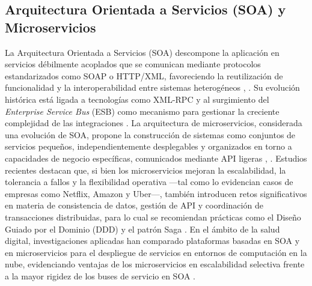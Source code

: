 \subsection{Arquitectura Orientada a Servicios (SOA) y Microservicios}

La Arquitectura Orientada a Servicios (SOA) descompone la aplicación en servicios débilmente acoplados que se comunican mediante protocolos estandarizados como SOAP o HTTP/XML, favoreciendo la reutilización de funcionalidad y la interoperabilidad entre sistemas heterogéneos \cite{lazarenko_arch}, \cite{opengroup_soa}. Su evolución histórica está ligada a tecnologías como XML-RPC y al surgimiento del \textit{Enterprise Service Bus} (ESB) como mecanismo para gestionar la creciente complejidad de las integraciones \cite{opengroup_soa}. La arquitectura de microservicios, considerada una evolución de SOA, propone la construcción de sistemas como conjuntos de servicios pequeños, independientemente desplegables y organizados en torno a capacidades de negocio específicas, comunicados mediante API ligeras \cite{gfg_patterns}, \cite{ijacsa_microservices}. Estudios recientes destacan que, si bien los microservicios mejoran la escalabilidad, la tolerancia a fallos y la flexibilidad operativa —tal como lo evidencian casos de empresas como Netflix, Amazon y Uber—, también introducen retos significativos en materia de consistencia de datos, gestión de API y coordinación de transacciones distribuidas, para lo cual se recomiendan prácticas como el Diseño Guiado por el Dominio (DDD) y el patrón Saga \cite{ijacsa_microservices}. En el ámbito de la salud digital, investigaciones aplicadas han comparado plataformas basadas en SOA y en microservicios para el despliegue de servicios en entornos de computación en la nube, evidenciando ventajas de los microservicios en escalabilidad selectiva frente a la mayor rigidez de los buses de servicio en SOA \cite{mdpi_ehealth}.
